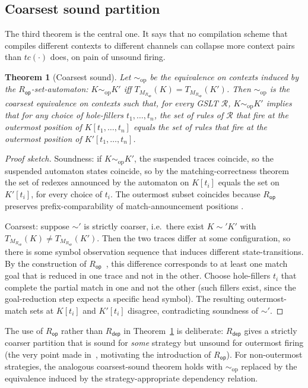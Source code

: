 \documentclass[11pt]{article}
\theoremstyle{plain}
\newtheorem{theorem}{Theorem}[section]
\theoremstyle{definition}
\theoremstyle{remark}
\newcommand{\rdep}{R_{\mathsf{dep}}}
\newcommand{\rop}{R_{\mathsf{op}}}
\begin{document}
\subsection{Coarsest sound partition}

The third theorem is the central one. It says that no compilation scheme
that compiles different contexts to different channels can collapse more
context pairs than $tc(\cdot)$ does, on pain of unsound firing.

\begin{theorem}[Coarsest sound]\label{thm:coarsest}
Let $\sim_{\mathrm{op}}$ be the equivalence on contexts induced by the
$\rop$-set-automaton: $K \sim_{\mathrm{op}} K'$ iff
$T_{M_{\rop}}(K) = T_{M_{\rop}}(K')$. Then $\sim_{\mathrm{op}}$ is the
coarsest equivalence on contexts such that, for every GSLT $\mathcal{R}$,
$K \sim_{\mathrm{op}} K'$ implies that for any choice of hole-fillers
$t_{1}, \ldots, t_{n}$, the set of rules of $\mathcal{R}$ that fire at the
outermost position of $K[t_{1}, \ldots, t_{n}]$ equals the set of rules
that fire at the outermost position of $K'[t_{1}, \ldots, t_{n}]$.
\end{theorem}

\begin{proof}[Proof sketch]
Soundness: if $K \sim_{\mathrm{op}} K'$, the suspended traces coincide, so
the suspended automaton states coincide, so by the matching-correctness
theorem~\cite[Theorem~2]{BouwmanErkens2022} the set of redexes announced
by the automaton on $K[t_{i}]$ equals the set on $K'[t_{i}]$, for every
choice of $t_{i}$. The outermost subset coincides because $\rop$ preserves
prefix-comparability of match-announcement positions
\cite[\S 7]{BouwmanErkens2022}.

Coarsest: suppose $\sim'$ is strictly coarser, i.e.\ there exist
$K \sim' K'$ with $T_{M_{\rop}}(K) \neq T_{M_{\rop}}(K')$. Then the two
traces differ at some configuration, so there is some symbol observation
sequence that induces different state-transitions. By the construction of
$\rop$~\cite[\S 7]{BouwmanErkens2022}, this difference corresponds to at
least one match goal that is reduced in one trace and not in the other.
Choose hole-fillers $t_{i}$ that complete the partial match in one and
not the other (such fillers exist, since the goal-reduction step expects
a specific head symbol). The resulting outermost-match sets at $K[t_{i}]$
and $K'[t_{i}]$ disagree, contradicting soundness of $\sim'$.
\end{proof}

The use of $\rop$ rather than $\rdep$ in Theorem~\ref{thm:coarsest} is
deliberate: $\rdep$ gives a strictly coarser partition that is sound for
\emph{some} strategy but unsound for outermost firing (the very point
made in~\cite[\S 7]{BouwmanErkens2022}, motivating the introduction of
$\rop$). For non-outermost strategies, the analogous coarsest-sound theorem
holds with $\sim_{\mathrm{op}}$ replaced by the equivalence induced by
the strategy-appropriate dependency relation.
\end{document}
